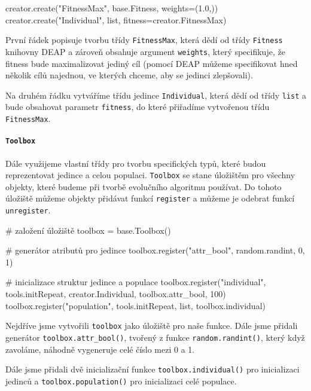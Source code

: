 \begin{code}
creator.create("FitnessMax", base.Fitness, weights=(1.0,))
creator.create("Individual", list, fitness=creator.FitnessMax)
\end{code}

První řádek popisuje tvorbu třídy \texttt{FitnessMax}, která dědí od třídy
\texttt{Fitness} knihovny DEAP a zároveň obsahuje argument \texttt{weights},
který specifikuje, že fitness bude maximalizovat jediný cíl (pomocí DEAP můžeme
specifikovat hned několik cílů najednou, ve kterých chceme, aby se jedinci
zlepšovali).

Na druhém řádku vytváříme třídu jedince \texttt{Individual}, která dědí od třídy
\texttt{list} a bude obsahovat parametr \texttt{fitness}, do které přiřadíme
vytvořenou třídu \texttt{FitnessMax}.

\paragraph{\texttt{Toolbox}}
Dále využijeme vlastní třídy pro tvorbu specifických typů, které budou
reprezentovat jedince a celou populaci. \texttt{Toolbox} se stane úložištěm pro
všechny objekty, které budeme při tvorbě evolučního algoritmu používat. Do
tohoto úložiště můžeme objekty přidávat funkcí \texttt{register} a můžeme je
odebrat funkcí \texttt{unregister}.

\pagebreak
\begin{code}
# založení úložiště 
toolbox = base.Toolbox()

# generátor atributů pro jedince
toolbox.register("attr_bool", random.randint, 0, 1)

# inicializace struktur jedince a populace
toolbox.register("individual", 
                 tools.initRepeat, 
                 creator.Individual, 
                 toolbox.attr_bool, 
                 100)
toolbox.register("population", 
                 tools.initRepeat, 
                 list, 
                 toolbox.individual)
\end{code}

Nejdříve jsme vytvořili \texttt{toolbox} jako úložiště pro naše funkce. Dále
jsme přidali generátor \texttt{toolbox.attr\_bool()}, tvořený z funkce
\texttt{random.randint()}, který když zavoláme, náhodně vygeneruje celé číslo
mezi 0 a 1.

Dále jsme přidali dvě inicializační funkce \texttt{toolbox.individual()} pro
inicializaci jedinců a \texttt{toolbox.population()} pro inicializaci celé
populace. 


